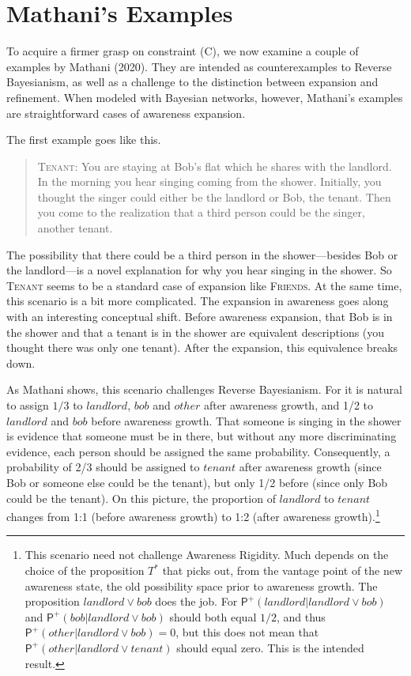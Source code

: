 \documentclass[
  11pt,
  dvipsnames,enabledeprecatedfontcommands, todos]{scrartcl}
\newcommand{\ppr}[2]{\ensuremath{\mathsf{P}^{#1}(#2)}}
\begin{document}
\hypertarget{mathanis-examples}{%
\section{Mathani's Examples}\label{mathanis-examples}}

\label{sec:mathani}

To acquire a firmer grasp on constraint (C), we now examine a couple of
examples by Mathani (2020). They are intended as counterexamples to
Reverse Bayesianism, as well as a challenge to the distinction between
expansion and refinement. When modeled with Bayesian networks, however,
Mathani's examples are straightforward cases of awareness expansion.

The first example goes like this.

\begin{quote}
\textsc{Tenant}: You are staying at Bob's flat which he shares with the
landlord. In the morning you hear singing coming from the shower.
Initially, you thought the singer could either be the landlord or Bob,
the tenant. Then you come to the realization that a third person could
be the singer, another tenant.
\end{quote}

\doublespace \noindent The possibility that there could be a third
person in the shower---besides Bob or the landlord---is a novel
explanation for why you hear singing in the shower. So \textsc{Tenant}
seems to be a standard case of expansion like \textsc{Friends}. At the
same time, this scenario is a bit more complicated. The expansion in
awareness goes along with an interesting conceptual shift. Before
awareness expansion, that Bob is in the shower and that a tenant is in
the shower are equivalent descriptions (you thought there was only one
tenant). After the expansion, this equivalence breaks down.

As Mathani shows, this scenario challenges Reverse Bayesianism. For it
is natural to assign \(1/3\) to \(landlord\), \(bob\) and \(other\)
after awareness growth, and 1/2 to \(landlord\) and \(bob\) before
awareness growth. That someone is singing in the shower is evidence that
someone must be in there, but without any more discriminating evidence,
each person should be assigned the same probability. Consequently, a
probability of 2/3 should be assigned to \(tenant\) after awareness
growth (since Bob or someone else could be the tenant), but only 1/2
before (since only Bob could be the tenant). On this picture, the
proportion of \(landlord\) to \(tenant\) changes from 1:1 (before
awareness growth) to 1:2 (after awareness growth).\footnote{This
  scenario need not challenge Awareness Rigidity. Much depends on the
  choice of the proposition \(T^*\) that picks out, from the vantage
  point of the new awareness state, the old possibility space prior to
  awareness growth. The proposition \(landlord \vee bob\) does the job.
  For \(\ppr{+}{landlord \vert landlord \vee bob}\) and
  \(\ppr{+}{bob \vert landlord \vee bob}\) should both equal \(1/2\),
  and thus \(\ppr{+}{other \vert landlord \vee bob}=0\), but this does
  not mean that \(\ppr{+}{other \vert landlord \vee tenant}\) should
  equal zero. This is the intended result.}
\end{document}

